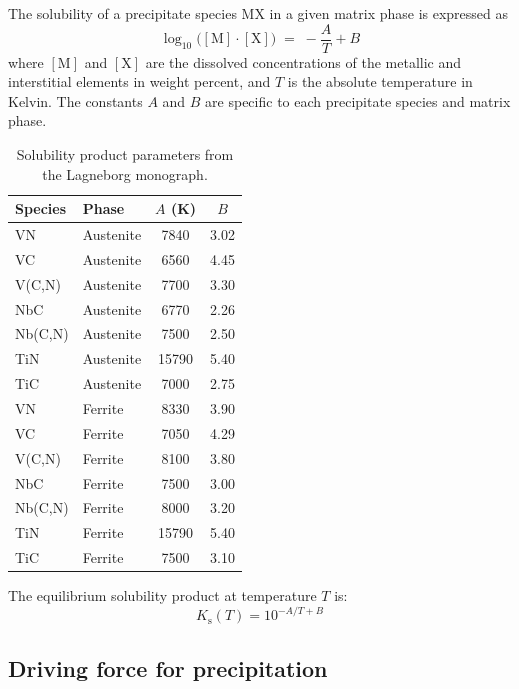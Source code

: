 \documentclass[11pt,a4paper]{article}
\begin{document}
The solubility of a precipitate species MX in a given matrix phase is expressed
as
\begin{equation}
  \log_{10}\bigl([\mathrm{M}]\cdot[\mathrm{X}]\bigr) \;=\; -\frac{A}{T} + B
  \label{eq:solprod}
\end{equation}
where $[\mathrm{M}]$ and $[\mathrm{X}]$ are the dissolved concentrations of the
metallic and interstitial elements in weight percent, and $T$ is the absolute
temperature in Kelvin.  The constants $A$ and $B$ are specific to each
precipitate species and matrix phase.

\begin{table}[htbp]
\centering
\caption{Solubility product parameters from the Lagneborg monograph.}
\label{tab:solprod}
\begin{tabular}{@{}llSS@{}}
\toprule
Species & Phase & {$A$ (K)} & {$B$} \\
\midrule
VN     & Austenite & 7840  & 3.02 \\
VC     & Austenite & 6560  & 4.45 \\
V(C,N) & Austenite & 7700  & 3.30 \\
NbC    & Austenite & 6770  & 2.26 \\
Nb(C,N)& Austenite & 7500  & 2.50 \\
TiN    & Austenite & 15790 & 5.40 \\
TiC    & Austenite & 7000  & 2.75 \\
\midrule
VN     & Ferrite   & 8330  & 3.90 \\
VC     & Ferrite   & 7050  & 4.29 \\
V(C,N) & Ferrite   & 8100  & 3.80 \\
NbC    & Ferrite   & 7500  & 3.00 \\
Nb(C,N)& Ferrite   & 8000  & 3.20 \\
TiN    & Ferrite   & 15790 & 5.40 \\
TiC    & Ferrite   & 7500  & 3.10 \\
\bottomrule
\end{tabular}
\end{table}

The equilibrium solubility product at temperature $T$ is:
\begin{equation}
  K_\mathrm{s}(T) = 10^{-A/T + B}
\end{equation}

\subsection{Driving force for precipitation}
\end{document}
